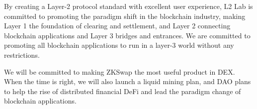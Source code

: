 \documentclass[]{template/llncs}
\begin{document}
By creating a Layer-2 protocol standard with excellent user experience, L2 Lab is committed to promoting the paradigm shift in the blockchain industry, making Layer 1 the foundation of clearing and settlement, and Layer 2 connecting blockchain applications and Layer 3 bridges and entrances. We are committed to promoting all blockchain applications to run in a layer-3 world without any restrictions.

We will be committed to making ZKSwap the most useful product in DEX. When the time is right, we will also launch a liquid mining plan, and DAO plans to help the rise of distributed financial DeFi and lead the paradigm change of blockchain applications.





\end{document}
